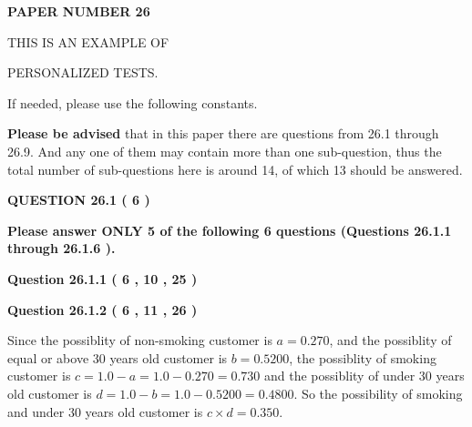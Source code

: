 \documentclass[12pt]{article}
\begin{document}
 
 
   
   
\newpage 
\setcounter{page}{ 
    26001 } 
   
   
   
   
 {\textbf{ \Large{ PAPER NUMBER           26  }}}
   
   
\vspace{0.2in}
   
   
   
   
   
   
 \vspace{0.2in}
 
 
{\Huge  THIS IS AN EXAMPLE OF}
 
{\Huge  PERSONALIZED TESTS. }
 
If needed, please use the following constants.
 
 
 
{\textbf{\large{Please be advised}}} that in this paper there are questions from
26.1 through
26.9.
And any one of them may contain more than one sub-question, thus the total number
of sub-questions here is around 14, of which
13 should be answered.
 
\vspace{0.3in}
 
 
   
   
  
\vspace{0.2in}
  
{\textbf{\Large{QUESTION
26.1 
 (           6 )
}}}
  
  
{\textbf{\Large{Please answer ONLY  %
           5  %
 of the following  %
           6  %
 questions (Questions  %
26.1.1 %
 through  %
26.1.6 %
 ). }}}
   
   
  
\vspace{0.2in}
  
{\textbf{\Large{Question
26.1.1 
 (           6 ,          10 ,          25 )
}}}
  
  
  
\vspace{0.2in}
  
{\textbf{\Large{Question
26.1.2 
 (           6 ,          11 ,          26 )
}}}
  
  
 
 

Since the possiblity of  %
 non-smoking customer is $ a =  %
0.270 $,
and the possiblity of  %
equal or above 30 years old customer is $ b =  %
0.5200 $,
the possiblity of  %
smoking customer is $ c = 1.0 - a = 1.0 -
0.270
=  %
0.730 $ and the possiblity of  %
under 30 years old
customer is $ d = 1.0 - b = 1.0 -  %
0.5200 =  %
0.4800  $.
So the possibility of  %
smoking and  %
under 30 years old
customer is $ c \times d =  %
0.350 $.
 
\end{document}
